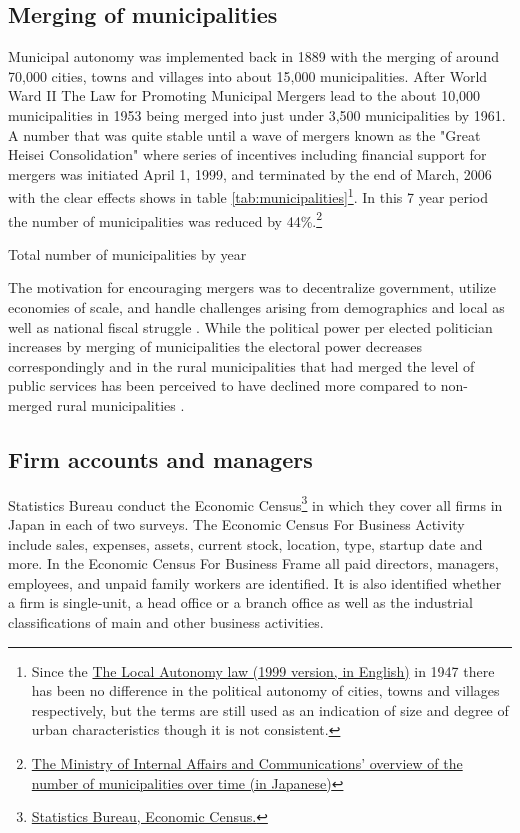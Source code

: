 \subsection{Merging of municipalities}
Municipal autonomy was implemented back in 1889 with the merging of around 70,000 cities, towns and villages into about 15,000 municipalities. After World Ward II The Law for Promoting Municipal Mergers lead to the about 10,000 municipalities in 1953 being merged into just under 3,500 municipalities by 1961. A number that was quite stable until a  wave of mergers known as the "Great Heisei Consolidation" where series of incentives including financial support for mergers was initiated April 1, 1999, and terminated by the end of March, 2006 \citep{michihiro2007local} with the clear effects shows in table \ref{tab:municipalities}\footnote{Since the \href{http://nippon.zaidan.info/seikabutsu/1999/00168/mokuji.htm}{The Local Autonomy law (1999 version, in English)} in 1947 there has been no difference in the political autonomy of cities, towns and villages respectively, but the terms are still used as an indication of size and degree of urban characteristics though it is not consistent.}. In this 7 year period the number of municipalities was reduced by 44\%.\footnote{\href{www.soumu.go.jp/gapei/gapei2.html}{The Ministry of Internal Affairs and Communications' overview of the number of municipalities over time (in Japanese)}}
\begin{table}[H]
  \centering
  \caption{Total number of municipalities by year}
  \footnotesize
    
  \label{tab:municipalities}
\end{table}\noindent
The motivation for encouraging mergers was to decentralize government, utilize economies of scale, and handle challenges arising from demographics and local as well as national fiscal struggle \citet{yokomichi2007development}. While the political power per elected politician increases by merging of municipalities the electoral power decreases correspondingly and in the rural municipalities that had merged the level of public services has been perceived to have declined more compared to non-merged rural municipalities \citep{yamada2018majority}.

\subsection{Firm accounts and managers}
Statistics Bureau conduct the Economic Census\footnote{\href{http://www.stat.go.jp/english/data/e-census.html}{Statistics Bureau, Economic Census.}} in which they cover all firms in Japan in each of two surveys. The Economic Census For Business Activity include sales, expenses, assets, current stock, location, type, startup date and more. In the Economic Census For Business Frame all paid directors, managers, employees, and unpaid family workers are identified. It is also identified whether a firm is single-unit, a head office or a branch office as well as the industrial classifications of main and other business activities.

